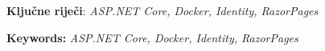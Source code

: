 \documentclass[12pt, a4paper]{article}
\begin{document}



\noindent\textbf{Ključne riječi}: \textit{ASP.NET Core, Docker, Identity, RazorPages}



\noindent\textbf{Keywords:} \textit{ASP.NET Core, Docker, Identity, RazorPages}
\newpage
{}


\newpage


\newpage


\newpage

\newpage


\newpage
{}



\newpage
\clearpage
\pagestyle{empty}

\begin{appendices}
\appendix

\listoffigures
\lstlistoflistings
\end{appendices}
\end{document}
